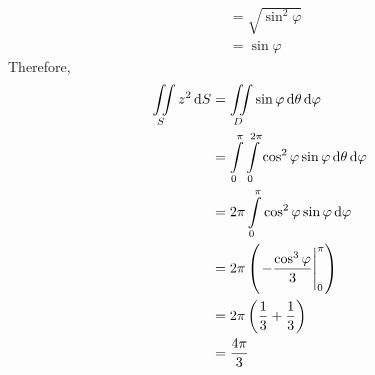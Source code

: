 \documentclass[fleqn, a4paper, 12pt, twoside]{article}
\theoremstyle{definition}
\theoremstyle{theorem}
\begin{document}
\begin{solution}
\begin{align*}
                                                                                   & = \sqrt{\sin^2 \varphi}                                                                              \\
                                                                                   & = \sin \varphi
	\end{align*}
	Therefore,
	\begin{align*}
		\iint\limits_{S} z^2 \dif S & = \iint\limits_{D} \sin \varphi \dif \theta \dif \varphi                                             \\
                                            & = \int\limits_{0}^{\pi} \int\limits_{0}^{2 \pi} \cos^2 \varphi \sin \varphi \dif \theta \dif \varphi \\
                                            & = 2 \pi \int\limits_{0}^{\pi} \cos^2 \varphi \sin \varphi \dif \varphi                               \\
                                            & = 2 \pi \left( \left. -\frac{\cos^3 \varphi}{3} \right|_{0}^{\pi} \right)                            \\
                                            & = 2 \pi \left( \frac{1}{3} + \frac{1}{3} \right)                                                     \\
                                            & = \frac{4 \pi}{3}
	\end{align*}
\end{solution}
\end{document}

